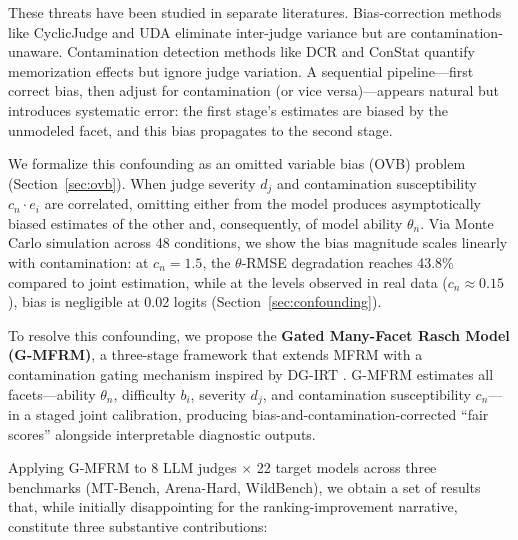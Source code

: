 \documentclass[11pt]{article}
\begin{document}
These threats have been studied in separate literatures.
Bias-correction methods like CyclicJudge \cite{li2024cyclicjudge} and UDA \cite{huang2024uda} eliminate inter-judge variance but are contamination-unaware.
Contamination detection methods like DCR \cite{yang2023dcr} and ConStat \cite{dekoninck2024constat} quantify memorization effects but ignore judge variation.
A sequential pipeline---first correct bias, then adjust for contamination (or vice versa)---appears natural but introduces systematic error: the first stage's estimates are biased by the unmodeled facet, and this bias propagates to the second stage.

We formalize this confounding as an omitted variable bias (OVB) problem (Section~\ref{sec:ovb}).
When judge severity $d_j$ and contamination susceptibility $c_n \cdot e_i$ are correlated, omitting either from the model produces asymptotically biased estimates of the other and, consequently, of model ability $\theta_n$.
Via Monte Carlo simulation across 48 conditions, we show the bias magnitude scales linearly with contamination: at $c_n = 1.5$, the $\theta$-RMSE degradation reaches 43.8\% compared to joint estimation, while at the levels observed in real data ($c_n \approx 0.15$), bias is negligible at 0.02 logits (Section~\ref{sec:confounding}).

To resolve this confounding, we propose the \textbf{Gated Many-Facet Rasch Model (G-MFRM)}, a three-stage framework that extends MFRM \cite{linacre1989many,eckes2011introduction} with a contamination gating mechanism inspired by DG-IRT \cite{shu2013item}.
G-MFRM estimates all facets---ability $\theta_n$, difficulty $b_i$, severity $d_j$, and contamination susceptibility $c_n$---in a staged joint calibration, producing bias-and-contamination-corrected ``fair scores'' alongside interpretable diagnostic outputs.

Applying G-MFRM to 8 LLM judges $\times$ 22 target models across three benchmarks (MT-Bench, Arena-Hard, WildBench), we obtain a set of results that, while initially disappointing for the ranking-improvement narrative, constitute three substantive contributions:
\end{document}
